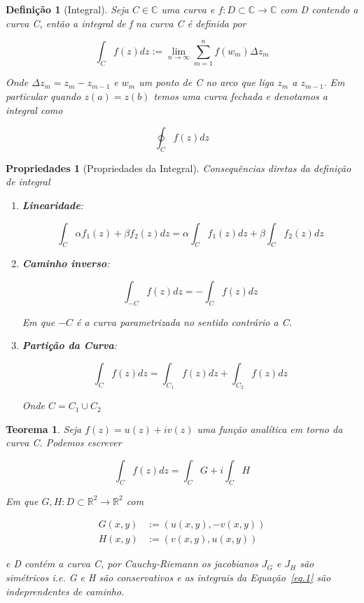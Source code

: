 \documentclass{article}
\newtheorem{prop}{Propriedades}
\newtheorem{theorem}{Teorema}
\newtheorem{definition}{Definição}
\begin{document}
\begin{definition}[Integral]
Seja $C \in \mathbb{C}$ uma curva e $f: D \subset \mathbb{C} \rightarrow \mathbb{C}$ com D contendo a curva C, então a integral de f na curva C é definida por

$$\int_C f(z) d z := \lim_{n \rightarrow \infty} \sum_{m=1}^n f(w_m) \Delta z_m$$

Onde $\Delta z_m = z_m - z_{m - 1}$ e $w_m$ um ponto de C no arco que liga $z_m$ a $z_{m - 1}$. Em particular quando $z(a) = z(b)$ temos uma curva fechada e denotamos a integral como

$$\oint_C f(z) d z$$
\end{definition}

\begin{prop}[Propriedades da Integral] Consequências diretas da definição de integral

\begin{enumerate}
    \item \textbf{Linearidade}:
    
    $$\int_C \alpha  f_1(z) + \beta f_2(z) d z = \alpha \int_C f_1(z) d z + \beta \int_C f_2(z) d z$$
    
    \item \textbf{Caminho inverso}:
    
    $$\int_{-C} f(z) d z = - \int_{C} f(z) d z$$
    
    Em que $-C$ é a curva parametrizada no sentido contrário a C.
    
    \item \textbf{Partição da Curva}:
    
    $$\int_C f(z) d z = \int_{C_1} f(z) d z + \int_{C_2} f(z) d z$$
    
    Onde $C = C_1 \cup C_2$
\end{enumerate}
\end{prop}

\begin{theorem}
Seja $f(z) = u(z) + i v(z)$ uma função analítica em torno da curva C. Podemos escrever

\begin{equation}\label{eq.1}
    \int_C f(z) dz = \int_C G + i \int_C H
\end{equation}

Em que $G,H: D \subset \mathbb{R}^2 \rightarrow \mathbb{R}^2$ com

\begin{align*}
    G(x, y) &:= (u(x, y), - v(x, y)) \\
    H(x, y) &:= (v(x, y), u(x, y))
\end{align*}

e D contém a curva C, por Cauchy-Riemann os jacobianos $J_G$ e $J_H$ são simétricos i.e. G e H são conservativos e as integrais da Equação~\ref{eq.1} são indeprendentes de caminho.
\end{theorem}
\end{document}
